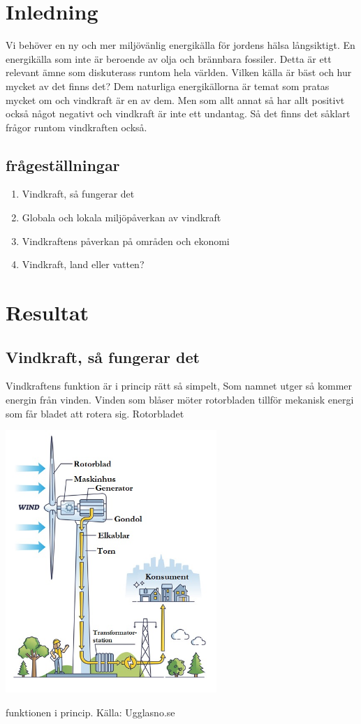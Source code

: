 \documentclass[11p]{article}
\begin{document}
    \section{Inledning}
    Vi behöver en ny och mer miljövänlig energikälla för jordens hälsa långsiktigt.
    En energikälla som inte är  beroende av olja och brännbara fossiler.
    Detta är ett relevant ämne som diskuterass runtom hela världen.
    Vilken källa är bäst och hur mycket av det finns det?
    Dem naturliga energikällorna är temat som pratas mycket om och vindkraft är en av dem.
    Men som allt annat så har allt positivt också något negativt och vindkraft är inte ett undantag.
    Så det finns det såklart frågor runtom vindkraften också.
    \subsection{frågeställningar}
    \begin{enumerate}
        \item Vindkraft, så fungerar det
        \item Globala och lokala miljöpåverkan av vindkraft
        \item Vindkraftens påverkan på områden och ekonomi
        \item Vindkraft, land eller vatten?
    \end{enumerate}

    \section{Resultat}

    \subsection{Vindkraft, så fungerar det}

    Vindkraftens funktion är i princip rätt så simpelt, Som namnet utger så kommer energin från vinden.
    Vinden som blåser möter rotorbladen tillför mekanisk energi som får bladet att rotera sig.
    Rotorbladet


    \includegraphics[width=0.6\textwidth]{../images/vindhur.jpg}
    \caption{funktionen i princip. Källa: Ugglasno.se}
\end{document}
